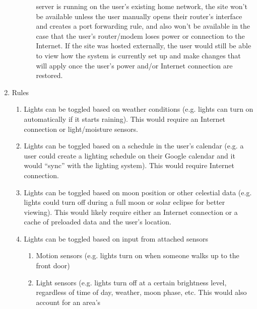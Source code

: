 \documentclass[12pt]{article}
\begin{document}
\begin{enumerate}[resume]
\begin{enumerate}
\begin{enumerate}
                        server is running on the user's existing home network,
                        the site won't be available unless the user manually
                        opens their router's interface and creates a port
                        forwarding rule, and also won't be available in the
                        case that the user's router/modem loses power or
                        connection to the Internet.  If the site was hosted
                        externally, the user would still be able to view how
                        the system is currently set up and make changes that
                        will apply once the user's power and/or Internet
                        connection are restored.
                \end{enumerate}
        \end{enumerate}
    \item Rules
        \begin{enumerate}
            \item Lights can be toggled based on weather conditions (e.g.
                lights can turn on automatically if it starts raining).  This
                would require an Internet connection or light/moisture sensors.
            \item Lights can be toggled based on a schedule in the user's
                calendar (e.g. a user could create a lighting schedule on their
                Google calendar and it would ``sync'' with the lighting
                system).  This would require Internet connection.
            \item Lights can be toggled based on moon position or other
                celestial data (e.g. lights could turn off during a full moon
                or solar eclipse for better viewing).  This would likely
                require either an Internet connection or a cache of preloaded
                data and the user's location.
            \item Lights can be toggled based on input from attached sensors
                \begin{enumerate}
                    \item Motion sensors (e.g. lights turn on when someone
                        walks up to the front door)
                    \item Light sensors (e.g. lights turn off at a certain
                        brightness level, regardless of time of day, weather,
                        moon phase, etc.  This would also account for an area's

\end{enumerate}
\end{enumerate}
\end{enumerate}
\end{document}
